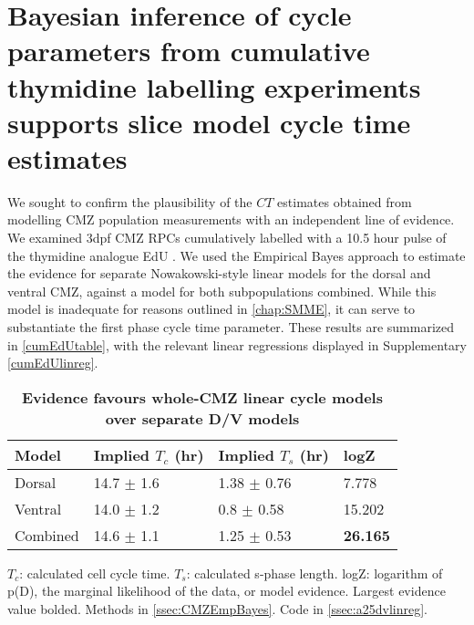 \section{Bayesian inference of cycle parameters from cumulative thymidine labelling experiments supports slice model cycle time estimates}
\label{ssec:CMZcumedu}

We sought to confirm the plausibility of the $CT$ estimates obtained from modelling CMZ population measurements with an independent line of evidence. We  examined 3dpf CMZ RPCs cumulatively labelled with a 10.5 hour pulse of the thymidine analogue EdU \cite{Chehrehasa2009}. We used the Empirical Bayes approach to estimate the evidence for separate Nowakowski-style \cite{Nowakowski1989} linear models for the dorsal and ventral CMZ, against a model for both subpopulations combined. While this model is inadequate for reasons outlined in \autoref{chap:SMME}, it can serve to substantiate the first phase cycle time parameter. These results are summarized in \autoref{cumEdUtable}, with the relevant linear regressions displayed in Supplementary \autoref{cumEdUlinreg}.

\begin{table}[!ht]
    \centering
    \caption{{\bf Evidence favours whole-CMZ linear cycle models over separate D/V models}}
    \begin{tabular}{|l|l|l|l|} 
        \hline {\bf Model} & {\bf Implied $T_c$ (hr)} & {\bf Implied $T_s$ (hr)} & {\bf logZ}\\ \hline 
        Dorsal & 14.7 $\pm$ 1.6 & 1.38 $\pm$ 0.76 & 7.778\\ \hline 
        Ventral & 14.0 $\pm$ 1.2 & 0.8 $\pm$ 0.58 & 15.202\\ \hline
        Combined & 14.6 $\pm$ 1.1 & 1.25 $\pm$ 0.53 & {\bf26.165}\\ \hline
    \end{tabular}
   
    \begin{flushleft} $T_c$: calculated cell cycle time. $T_s$: calculated s-phase length. logZ: logarithm of p(D), the marginal likelihood of the data, or model evidence.  Largest evidence value bolded.
    Methods in \autoref{ssec:CMZEmpBayes}.
    Code in \autoref{ssec:a25dvlinreg}.    

    \end{flushleft}
    \label{cumEdUtable}
\end{table}

